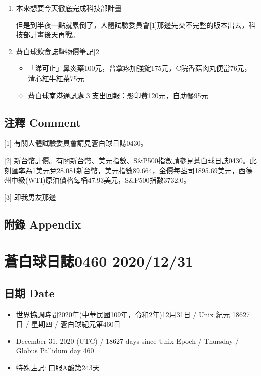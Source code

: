 \documentclass[a5paper, 11pt
]{book}
\providecommand{\tightlist}{%
  \setlength{\itemsep}{0pt}\setlength{\parskip}{0pt}}
\begin{document}
\begin{enumerate}
\def\labelenumi{\arabic{enumi}.}
\item
  本來想要今天徹底完成科技部計畫

  但是到半夜一點就累倒了，人體試驗委員會{[}1{]}那邊先交不完整的版本出去，科技部計畫後天再戰。
\item
  蒼白球飲食誌暨物價筆記{[}2{]}

  \begin{itemize}
  \tightlist
  \item
    「涕可止」鼻炎藥100元，普拿疼加強錠175元，C院香菇肉丸便當76元，清心紅牛紅茶75元
  \item
    蒼白球南港通訊處{[}3{]}支出回報：影印費120元，自助餐95元
  \end{itemize}
\end{enumerate}

\hypertarget{ux6ce8ux91cb-comment-29}{%
\subsection{注釋 Comment}\label{ux6ce8ux91cb-comment-29}}

{[}1{]} 有關人體試驗委員會請見蒼白球日誌0430。

{[}2{]}
新台幣計價。有關新台幣、美元指數、S\&P500指數請參見蒼白球日誌0430。此刻匯率為1美元兌28.081新台幣，美元指數89.664，金價每盎司1895.69美元，西德州中級(WTI)原油價格每桶47.93美元，S\&P500指數3732.0。

{[}3{]} 即我男友那邊

\hypertarget{ux9644ux9304-appendix-29}{%
\subsection{附錄 Appendix}\label{ux9644ux9304-appendix-29}}

\hypertarget{ux84bcux767dux7403ux65e5ux8a8c0460-20201231}{%
\section{蒼白球日誌0460
2020/12/31}\label{ux84bcux767dux7403ux65e5ux8a8c0460-20201231}}

\hypertarget{ux65e5ux671f-date-30}{%
\subsection{日期 Date}\label{ux65e5ux671f-date-30}}

\begin{itemize}
\tightlist
\item
  世界協調時間2020年(中華民國109年，令和2年)12月31日 / Unix 紀元 18627
  日 / 星期四 / 蒼白球紀元第460日
\item
  December 31, 2020 (UTC) / 18627 days since Unix Epoch / Thursday /
  Globus Pallidum day 460
\item
  特殊註記: 口服A酸第243天
\end{itemize}
\end{document}
